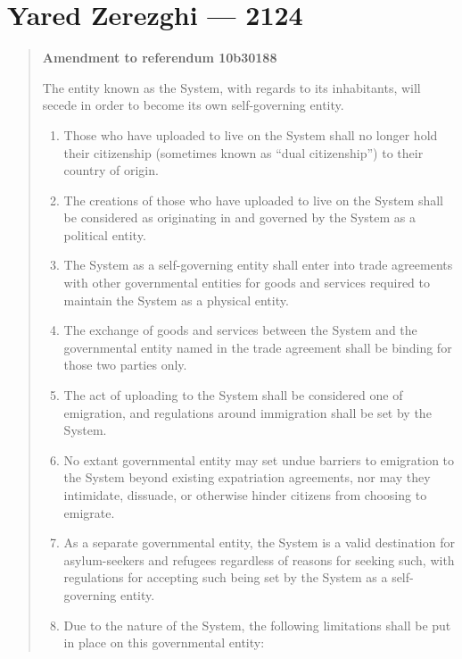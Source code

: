 \hypertarget{yared-zerezghi-2124}{%
\chapter{Yared Zerezghi — 2124}\label{yared-zerezghi-2124}}

\begin{quote}
\textbf{Amendment to referendum 10b30188}

The entity known as the System, with regards to its inhabitants, will secede in order to become its own self-governing entity.

\begin{enumerate}
\def\labelenumi{\arabic{enumi}.}
\tightlist
\item
  Those who have uploaded to live on the System shall no longer hold their citizenship (sometimes known as ``dual citizenship'') to their country of origin.
\item
  The creations of those who have uploaded to live on the System shall be considered as originating in and governed by the System as a political entity.
\item
  The System as a self-governing entity shall enter into trade agreements with other governmental entities for goods and services required to maintain the System as a physical entity.
\item
  The exchange of goods and services between the System and the governmental entity named in the trade agreement shall be binding for those two parties only.
\item
  The act of uploading to the System shall be considered one of emigration, and regulations around immigration shall be set by the System.
\item
  No extant governmental entity may set undue barriers to emigration to the System beyond existing expatriation agreements, nor may they intimidate, dissuade, or otherwise hinder citizens from choosing to emigrate.
\item
  As a separate governmental entity, the System is a valid destination for asylum-seekers and refugees regardless of reasons for seeking such, with regulations for accepting such being set by the System as a self-governing entity.
\item
  Due to the nature of the System, the following limitations shall be put in place on this governmental entity:


\end{enumerate}
\end{quote}

